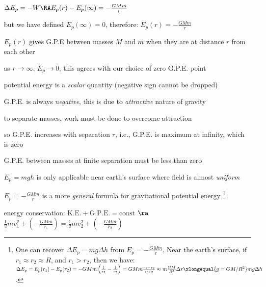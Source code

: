 $\Delta E_p = -W \RA E_p(r) - E_p(\infty) = - \frac{GMm}{r}$

but we have defined $E_p(\infty)=0$, therefore: $\boxed{E_p(r)= -\frac{GMm}{r}}$

$E_p(r)$ gives G.P.E between masses $M$ and $m$ when they are at distance $r$ from each other

\cmt as $r \to \infty$, $E_p \to 0$, this agrees with our choice of zero G.P.E. point

\cmt potential energy is a \emph{scalar} quantity (negative sign cannot be dropped)

\cmt G.P.E. is always \emph{negative}, this is due to \emph{attractive} nature of gravity

to separate masses, work must be done to overcome attraction

so G.P.E. increases with separation $r$, i.e., G.P.E. is maximum at infinity, which is zero

G.P.E. between masses at finite separation must be less than zero

\cmt $E_p=mgh$ is only applicable near earth's surface where field is almost \emph{uniform}

$E_p =-\frac{GMm}{r}$ is a more \emph{general} formula for gravitational potential energy
\footnote{One can recover $\Delta E_p=mg\Delta h$ from $E_p=-\frac{GMm}{r}$. Near the earth's surface, if $r_1\approx r_2\approx R$, and $r_1>r_2$, then we have: $\Delta E_p = E_p(r_1) - E_p(r_2) = -GMm\left(\frac{1}{r_1}-\frac{1}{r_2}\right) = GMm \frac{r_1-r_2}{r_1r_2} \approx m \frac{GM}{R^2} \Delta r \xlongequal{g=GM/R^2} mg\Delta h$.}




\sol energy conservation: $\text{K.E.} + \text{G.P.E.} = \text{const}$ $\ra$ $\frac{1}{2}mv_1^2+\left(-\frac{GMm}{r_1}\right) = \frac{1}{2}mv_2^2+\left(-\frac{GMm}{r_2}\right)$ \eoe

	
